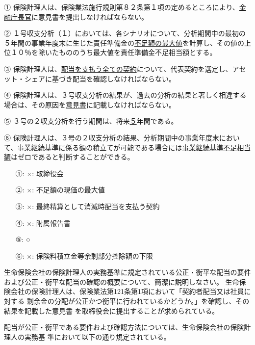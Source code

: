 \documentclass[report,gutter=10mm,fore-edge=10mm,uplatex,dvipdfmx]{jlreq}
\begin{document}
① 保険計理人は、保険業法施行規則第８２条第１項の定めるところにより、\underline{金融庁長官}に意見書を提出しなければならない。

② １号収支分析（１）においては、各シナリオについて、分析期間中の最初の５年間の事業年度末に生じた責任準備金の\underline{不足額の最大値}を計算し、その値の上位１０％を除いたもののうち最大値を責任準備金不足相当額とする。

③ 保険計理人は、\underline{配当を支払う全ての契約}について、代表契約を選定し、アセット・シェアに基づき配当を確認しなければならない。

④ 保険計理人は、３号収支分析の結果が、過去の分析の結果と著しく相違する場合は、その原因を\underline{意見書}に記載しなければならない。

⑤ ３号の２収支分析を行う期間は、将来\underline{５}年間である。

⑥ 保険計理人は、３号の２収支分析の結果、分析期間中の事業年度末において、事業継続基準に係る額の積立てが可能である場合には\underline{事業継続基準不足相当額}はゼロであると判断することができる。
\answer{}
\begin{itemize}
\item[ ①: ] ×: 取締役会
\item[ ②: ] ×: 不足額の現価の最大値
\item[ ③: ] ×: 最終精算として消滅時配当を支払う契約
\item[ ④: ] ×: 附属報告書
\item[ ⑤: ] ○ 
\item[ ⑥: ] ×: 保険料積立金等余剰部分控除額の下限
\end{itemize}

生命保険会社の保険計理人の実務基準に規定されている公正・衡平な配当の要件および公正・衡平な配当の確認の概要について、簡潔に説明しなさい。
\answer{}
生命保険会社の保険計理人は、保険業法第121条第1項において「契約者配当又は社員に対する
剰余金の分配が公正かつ衡平に行われているかどうか。」を確認し、その結果を記載した意見書
を取締役会に提出することが求められている。

配当が公正・衡平である要件および確認方法については、生命保険会社の保険計理人の実務基
準において以下の通り規定されている。
\end{document}
